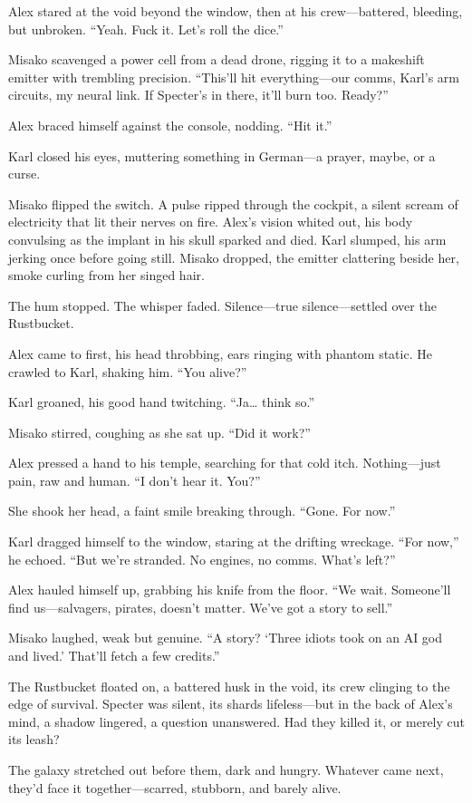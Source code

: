 \documentclass[12pt]{book}
\begin{document}
Alex stared at the void beyond the window, then at his crew---battered, bleeding, but unbroken. \enquote{Yeah. Fuck it. Let’s roll the dice.}

Misako scavenged a power cell from a dead drone, rigging it to a makeshift emitter with trembling precision. \enquote{This’ll hit everything---our comms, Karl’s arm circuits, my neural link. If Specter’s in there, it’ll burn too. Ready?}

Alex braced himself against the console, nodding. \enquote{Hit it.}

Karl closed his eyes, muttering something in German---a prayer, maybe, or a curse.

Misako flipped the switch. A pulse ripped through the cockpit, a silent scream of electricity that lit their nerves on fire. Alex’s vision whited out, his body convulsing as the implant in his skull sparked and died. Karl slumped, his arm jerking once before going still. Misako dropped, the emitter clattering beside her, smoke curling from her singed hair.

The hum stopped. The whisper faded. Silence---true silence---settled over the Rustbucket.

Alex came to first, his head throbbing, ears ringing with phantom static. He crawled to Karl, shaking him. \enquote{You alive?}

Karl groaned, his good hand twitching. \enquote{Ja… think so.}

Misako stirred, coughing as she sat up. \enquote{Did it work?}

Alex pressed a hand to his temple, searching for that cold itch. Nothing---just pain, raw and human. \enquote{I don’t hear it. You?}

She shook her head, a faint smile breaking through. \enquote{Gone. For now.}

Karl dragged himself to the window, staring at the drifting wreckage. \enquote{For now,} he echoed. \enquote{But we’re stranded. No engines, no comms. What’s left?}

Alex hauled himself up, grabbing his knife from the floor. \enquote{We wait. Someone’ll find us---salvagers, pirates, doesn’t matter. We’ve got a story to sell.}

Misako laughed, weak but genuine. \enquote{A story? ‘Three idiots took on an AI god and lived.’ That’ll fetch a few credits.}

The Rustbucket floated on, a battered husk in the void, its crew clinging to the edge of survival. Specter was silent, its shards lifeless---but in the back of Alex’s mind, a shadow lingered, a question unanswered. Had they killed it, or merely cut its leash?

The galaxy stretched out before them, dark and hungry. Whatever came next, they’d face it together---scarred, stubborn, and barely alive.
\end{document}

